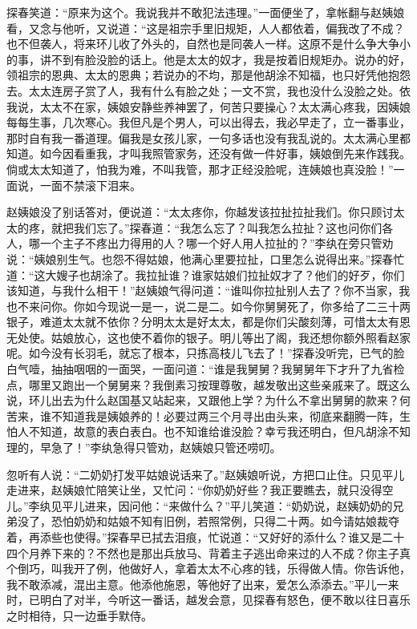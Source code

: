 \documentclass[12pt,oneside]{book}
\begin{document}
探春笑道：“原来为这个。我说我并不敢犯法违理。”一面便坐了，拿帐翻与赵姨娘看，又念与他听，又说道：“这是祖宗手里旧规矩，人人都依着，偏我改了不成？也不但袭人，将来环儿收了外头的，自然也是同袭人一样。这原不是什么争大争小的事，讲不到有脸没脸的话上。他是太太的奴才，我是按着旧规矩办。说办的好，领祖宗的恩典、太太的恩典；若说办的不均，那是他胡涂不知福，也只好凭他抱怨去。太太连房子赏了人，我有什么有脸之处；一文不赏，我也没什么没脸之处。依我说，太太不在家，姨娘安静些养神罢了，何苦只要操心？太太满心疼我，因姨娘每每生事，几次寒心。我但凡是个男人，可以出得去，我必早走了，立一番事业，那时自有我一番道理。偏我是女孩儿家，一句多话也没有我乱说的。太太满心里都知道。如今因看重我，才叫我照管家务，还没有做一件好事，姨娘倒先来作践我。倘或太太知道了，怕我为难，不叫我管，那才正经没脸呢，连姨娘也真没脸！”一面说，一面不禁滚下泪来。

赵姨娘没了别话答对，便说道：“太太疼你，你越发该拉扯拉扯我们。你只顾讨太太的疼，就把我们忘了。”探春道：“我怎么忘了？叫我怎么拉扯？这也问你们各人，哪一个主子不疼出力得用的人？哪一个好人用人拉扯的？”李纨在旁只管劝说：“姨娘别生气。也怨不得姑娘，他满心里要拉扯，口里怎么说得出来。”探春忙道：“这大嫂子也胡涂了。我拉扯谁？谁家姑娘们拉扯奴才了？他们的好歹，你们该知道，与我什么相干！”赵姨娘气得问道：“谁叫你拉扯别人去了？你不当家，我也不来问你。你如今现说一是一，说二是二。如今你舅舅死了，你多给了二三十两银子，难道太太就不依你？分明太太是好太太，都是你们尖酸刻薄，可惜太太有恩无处使。姑娘放心，这也使不着你的银子。明儿等出了阁，我还想你额外照看赵家呢。如今没有长羽毛，就忘了根本，只拣高枝儿飞去了！”探春没听完，已气的脸白气噎，抽抽咽咽的一面哭，一面问道：“谁是我舅舅？我舅舅年下才升了九省检点，哪里又跑出一个舅舅来？我倒素习按理尊敬，越发敬出这些亲戚来了。既这么说，环儿出去为什么赵国基又站起来，又跟他上学？为什么不拿出舅舅的款来？何苦来，谁不知道我是姨娘养的！必要过两三个月寻出由头来，彻底来翻腾一阵，生怕人不知道，故意的表白表白。也不知谁给谁没脸？幸亏我还明白，但凡胡涂不知理的，早急了！”李纨急得只管劝，赵姨娘只管还唠叨。

忽听有人说：“二奶奶打发平姑娘说话来了。”赵姨娘听说，方把口止住。只见平儿走进来，赵姨娘忙陪笑让坐，又忙问：“你奶奶好些？我正要瞧去，就只没得空儿。”李纨见平儿进来，因问他：“来做什么？”平儿笑道：“奶奶说，赵姨奶奶的兄弟没了，恐怕奶奶和姑娘不知有旧例，若照常例，只得二十两。如今请姑娘裁夺着，再添些也使得。”探春早已拭去泪痕，忙说道：“又好好的添什么？谁又是二十四个月养下来的？不然也是那出兵放马、背着主子逃出命来过的人不成？你主子真个倒巧，叫我开了例，他做好人，拿着太太不心疼的钱，乐得做人情。你告诉他，我不敢添减，混出主意。他添他施恩，等他好了出来，爱怎么添添去。”平儿一来时，已明白了对半，今听这一番话，越发会意，见探春有怒色，便不敢以往日喜乐之时相待，只一边垂手默侍。
\end{document}
